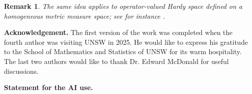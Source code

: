 \documentclass[11]{amsart}
\numberwithin{equation}{section}
\newtheorem{remark}[theorem]{Remark}
\begin{document}
\begin{remark}
	The same idea applies to operator-valued Hardy space defined on a  homogeneous metric measure space; see for instance \cite{FHW2023}. 
\end{remark}

{\bf Acknowledgement.}
The first version of the work was completed when the fourth author was visiting UNSW in 2025. He would like to express his gratitude to the School of Mathematics and Statistics of UNSW for its warm hospitality. The last two authors would like to thank Dr. Edward McDonald for useful discussions.

{\bf Statement for the AI use.}



%
%


\providecommand{\bysame}{\leavevmode\hbox to3em{\hrulefill}\thinspace}
\providecommand{\MR}{\relax\ifhmode\unskip\space\fi MR }
\providecommand{\MRhref}[2]{%
	\href{http://www.ams.org/mathscinet-getitem?mr=#1}{#2}
}
\providecommand{\href}[2]{#2}
\end{document}
